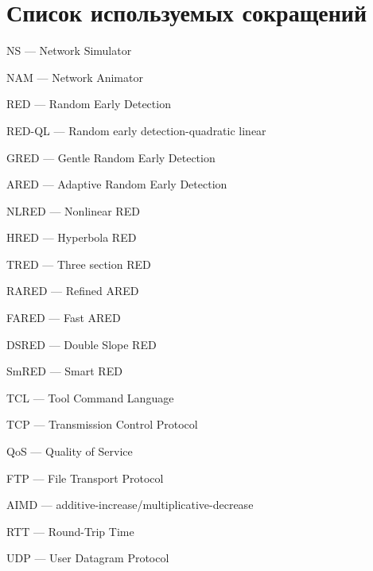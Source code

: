 \chapter*{Список используемых сокращений}

\mbox{}

NS --- Network Simulator

NAM --- Network Animator

RED --- Random Early Detection

RED-QL --- Random early detection-quadratic linear

GRED --- Gentle Random Early Detection

ARED --- Adaptive Random Early Detection

NLRED --- Nonlinear RED

HRED --- Hyperbola RED

TRED --- Three section RED

RARED --- Refined ARED

FARED --- Fast ARED

DSRED --- Double Slope RED

SmRED --- Smart RED

TCL --- Tool Command Language

TCP --- Transmission Control Protocol

QoS --- Quality of Service

FTP --- File Transport Protocol

AIMD --- additive-increase/multiplicative-decrease

RTT --- Round-Trip Time

UDP --- User Datagram Protocol

